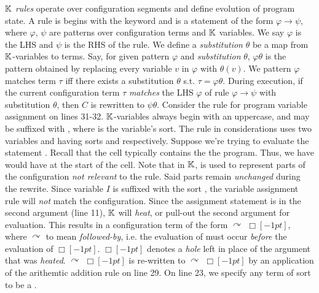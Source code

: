 $\mathbb{K}$ \emph{rules} operate over configuration segments and define evolution of
program state. A rule is begins with the keyword 
and is a statement of the form $\varphi \rightarrow \psi$, where
$\varphi$, $\psi$ are patterns over configuration terms and $\mathbb{K}$ variables.
We say $\varphi$ is the LHS and $\psi$ is the RHS of the rule.
We define a \emph{substitution} $\theta$ be a map from $\mathbb{K}$-variables to terms.
Say, for given pattern $\varphi$ and \emph{substitution} $\theta$,
$\varphi\theta$ is the pattern obtained by replacing every variable $v$ in
$\varphi$ with $\theta(v)$. We pattern $\varphi$ matches
term $\tau$ iff there exists a substitution $\theta$ s.t. $\tau = \varphi\theta$.
During execution, if the current configuration term
$\tau$ \emph{matches} the LHS $\varphi$ of rule $\varphi \rightarrow \psi$
with substitution $\theta$, then $C$ is rewritten to $\psi\theta$.
Consider the rule for program variable assignment on lines 31-32.
$\mathbb{K}$-variables always begin with an uppercase, and may be suffixed with
, where  is the variable's sort.
The rule in considerations uses two variables  and 
having sorts  and  respectively. Suppose
we're trying to evaluate the statement .
Recall that the  cell typically contains the
the program. Thus, we have would have  at the start
of the cell. Note that in $\mathbb{K}$,  is used to represent
parts of the configuration \emph{not relevant} to the rule. Said parts remain
\emph{unchanged} during the rewrite. Since variable $I$ is suffixed with the sort
, the variable assignment rule will \emph{not} match the
configuration. Since the assignment statement is  in
the second argument (line 11), $\mathbb{K}$ will \emph{heat}, or pull-out the second
argument for evaluation. This results in a configuration term of the form
 $\curvearrowright$ $ \Box[-1pt]$, where  $\curvearrowright$ to mean \emph{followed-by}, i.e.
the evaluation of  must occur \emph{before} the evaluation
of $\Box[-1pt]$\inlinek{;}. $\Box[-1pt]$
denotes a \emph{hole} left in place of the argument that was \emph{heated}.
 $\curvearrowright$  $\Box[-1pt]$ is re-written to  $\curvearrowright$ $
\Box[-1pt]$ by an application of the arithemtic addition rule on line 29. On
line 23, we specify any term of sort  to be a .
